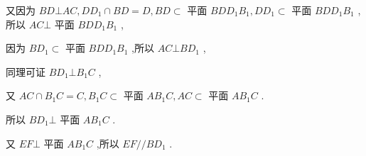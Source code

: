 \begin{enumerate}
\begin{jieda}
\begin{enumerate}
            又因为 ${BD} \bot  {AC},D{D}_{1} \cap  {BD} = D,{BD} \subset$ 平面 ${BD}{D}_{1}{B}_{1},D{D}_{1} \subset$ 平面 ${BD}{D}_{1}{B}_{1}$ , 所以 ${AC} \bot$ 平面 ${BD}{D}_{1}{B}_{1}$ ,
            
            因为 $B{D}_{1} \subset$ 平面 ${BD}{D}_{1}{B}_{1}$ ,所以 ${AC} \bot  B{D}_{1}$ ,
            
            同理可证 $B{D}_{1} \bot  {B}_{1}C$ ,
            
            又 ${AC} \cap  {B}_{1}C = C,{B}_{1}C \subset$ 平面 $A{B}_{1}C,{AC} \subset$ 平面 $A{B}_{1}C$ .
            
            所以 $B{D}_{1} \bot$ 平面 $A{B}_{1}C$ .
            
            又 ${EF} \bot$ 平面 $A{B}_{1}C$ ,所以 ${EF}//B{D}_{1}$ .
        \end{enumerate}
    \end{jieda}
\end{enumerate}

